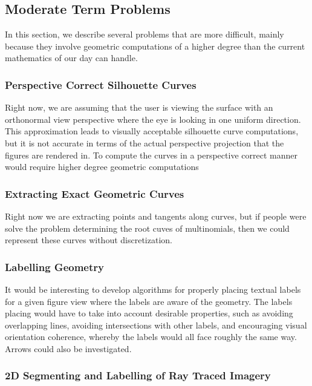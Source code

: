 \documentclass[12pt, letterpaper]{article}
\begin{document}
	\subsection{Moderate Term Problems}

		In this section, we describe several problems that are more difficult,
		mainly because they involve geometric computations of a higher degree than the current mathematics of our day can handle.
		
		\subsubsection{Perspective Correct Silhouette Curves}
		Right now, we are assuming that the user is viewing the surface with an orthonormal view perspective where the eye is looking in one uniform direction.
		This approximation leads to visually acceptable silhouette curve computations, but it is not accurate in terms of the actual perspective projection that the figures are rendered in.
		To compute the curves in a perspective correct manner would require higher degree geometric computations 

		\subsubsection{Extracting Exact Geometric Curves}
		Right now we are extracting points and tangents along curves, but if people were solve the problem determining the root cuves of multinomials, then we could represent these curves without discretization.

		\subsubsection{Labelling Geometry}

		It would be interesting to develop algorithms for properly placing textual labels for a given figure view where the labels are aware of the geometry.
		The labels placing would have to take into account desirable properties, such as avoiding overlapping lines, avoiding intersections with other labels, and encouraging visual orientation coherence, whereby the labels would all face roughly the same way.
		Arrows could also be investigated.

		\subsubsection{2D Segmenting and Labelling of Ray Traced Imagery}
\end{document}
